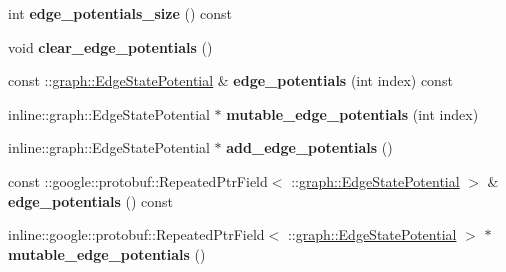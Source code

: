\begin{DoxyCompactItemize}
\item 
\hypertarget{classgraph_1_1MRFEdge_ae838e1baabe8852d5ec775f0284ba8b7}{
int {\bfseries edge\_\-potentials\_\-size} () const }
\label{classgraph_1_1MRFEdge_ae838e1baabe8852d5ec775f0284ba8b7}

\item 
\hypertarget{classgraph_1_1MRFEdge_a53d239c44edb18262f0a3c13fd88fb03}{
void {\bfseries clear\_\-edge\_\-potentials} ()}
\label{classgraph_1_1MRFEdge_a53d239c44edb18262f0a3c13fd88fb03}

\item 
\hypertarget{classgraph_1_1MRFEdge_a0c7561719b73dd2ef987c7c79382f73a}{
const ::\hyperlink{classgraph_1_1EdgeStatePotential}{graph::EdgeStatePotential} \& {\bfseries edge\_\-potentials} (int index) const }
\label{classgraph_1_1MRFEdge_a0c7561719b73dd2ef987c7c79382f73a}

\item 
\hypertarget{classgraph_1_1MRFEdge_af24041a8077b2492fdcbece14538e005}{
inline::graph::EdgeStatePotential $\ast$ {\bfseries mutable\_\-edge\_\-potentials} (int index)}
\label{classgraph_1_1MRFEdge_af24041a8077b2492fdcbece14538e005}

\item 
\hypertarget{classgraph_1_1MRFEdge_a6ae64a2442efe81d52e83b5938820f54}{
inline::graph::EdgeStatePotential $\ast$ {\bfseries add\_\-edge\_\-potentials} ()}
\label{classgraph_1_1MRFEdge_a6ae64a2442efe81d52e83b5938820f54}

\item 
\hypertarget{classgraph_1_1MRFEdge_a11ed986256d3adfc206080df3720d146}{
const ::google::protobuf::RepeatedPtrField$<$ ::\hyperlink{classgraph_1_1EdgeStatePotential}{graph::EdgeStatePotential} $>$ \& {\bfseries edge\_\-potentials} () const }
\label{classgraph_1_1MRFEdge_a11ed986256d3adfc206080df3720d146}

\item 
\hypertarget{classgraph_1_1MRFEdge_ab4e41bd27f096548e580552dbfdb3e35}{
inline::google::protobuf::RepeatedPtrField$<$ ::\hyperlink{classgraph_1_1EdgeStatePotential}{graph::EdgeStatePotential} $>$ $\ast$ {\bfseries mutable\_\-edge\_\-potentials} ()}
\label{classgraph_1_1MRFEdge_ab4e41bd27f096548e580552dbfdb3e35}

\end{DoxyCompactItemize}
